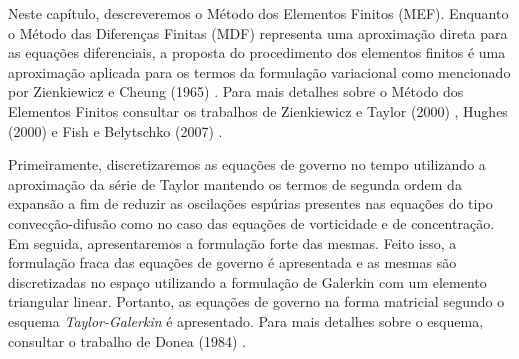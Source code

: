 Neste capítulo, descreveremos o Método dos
Elementos Finitos (MEF). Enquanto o Método
das Diferenças Finitas (MDF) representa
uma aproximação direta para as equações
diferenciais, a proposta do procedimento
dos elementos finitos é uma aproximação
aplicada para os termos da formulação
variacional como mencionado por Zienkiewicz e Cheung (1965) \cite{zienkiewicz1965}. 
Para mais detalhes sobre o Método dos Elementos
Finitos consultar os trabalhos de Zienkiewicz e Taylor (2000) \cite{zienkiewiczvol3},
Hughes (2000) \cite{hughes2000} e Fish e Belytschko (2007) \cite{fish2007}. \par 

Primeiramente, discretizaremos as equações
de governo no tempo utilizando
a aproximação da série de Taylor
mantendo os termos de segunda ordem da expansão
a fim de reduzir as oscilações espúrias
presentes nas equações do tipo convecção-difusão
como no caso das equações de vorticidade e de concentração.
Em seguida, apresentaremos a formulação
forte das mesmas. 
Feito isso, a formulação fraca das equações
de governo é apresentada e as mesmas são
discretizadas no espaço utilizando a formulação
de Galerkin com um elemento triangular linear.
Portanto, as equações de governo na forma matricial
segundo o esquema \textit{Taylor-Galerkin} é apresentado. Para mais detalhes
sobre o esquema, consultar o trabalho de Donea (1984) \cite{donea1984}.


